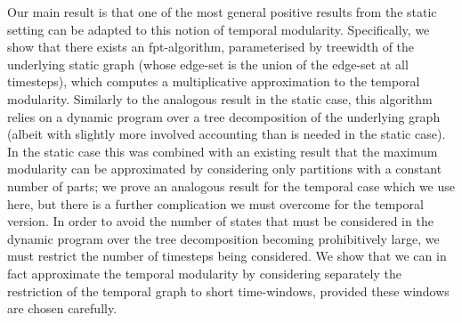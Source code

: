 \documentclass[runningheads]{llncs}
\begin{document}






Our main result is that one of the most general positive results from the static setting can be adapted to this notion of temporal modularity.  Specifically, we show that there exists an fpt-algorithm, parameterised by treewidth of the underlying static graph (whose edge-set is the union of the edge-set at all timesteps), which computes a multiplicative approximation to the temporal modularity.  Similarly to the analogous result in the static case, this algorithm relies on a dynamic program over a tree decomposition of the underlying graph (albeit with slightly more involved accounting than is needed in the static case).  In the static case this was combined with an existing result that the maximum modularity can be approximated by considering only partitions with a constant number of parts; we prove an analogous result for the temporal case which we use here, but there is a further complication we must overcome for the temporal version.  In order to avoid the number of states that must be considered in the dynamic program over the tree decomposition becoming prohibitively large, we must restrict the number of timesteps being considered.  We show that we can in fact approximate the temporal modularity by considering separately the restriction of the temporal graph to short time-windows, provided these windows are chosen carefully.  



\end{document}
